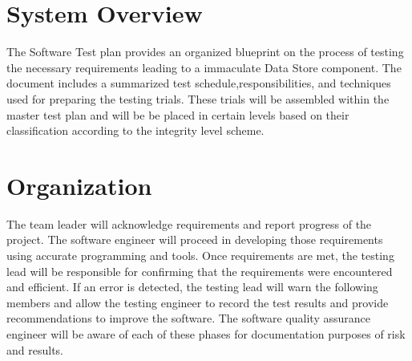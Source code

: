 \documentclass[letterpaper,12pt,oneside,listof=totoc]{scrreprt}
\begin{document}

\section{System Overview}

The Software Test plan provides an organized blueprint on the process of testing the necessary requirements leading to a immaculate Data Store component. The document includes a summarized test schedule,responsibilities, and techniques used for preparing the testing trials. These trials will be assembled within the master test plan and will be be placed in certain levels based on their classification according to the integrity level scheme.

\section{Organization}
The team leader will acknowledge requirements and report progress of the project. The software engineer will proceed in developing those requirements using accurate programming and tools. Once requirements are met, the testing lead will be responsible for confirming that the requirements were encountered and efficient. If an error is detected, the testing lead will warn the following members and allow the testing engineer to record the test results and provide recommendations to improve the software. The software quality assurance engineer will be aware of each of these phases for documentation purposes of  risk and results.
\end{document}
